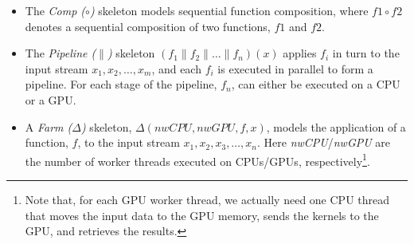 \documentclass[smallextended]{svjour3}
\begin{document}
\begin{itemize}
\item The \emph{Comp ($\circ$)} skeleton models sequential function composition, where
$f1 \circ f2$ denotes a sequential composition of two functions, $f1$ and $f2$.
\item The \emph{Pipeline ($\parallel$)} skeleton 
  $(f_1 \parallel f_2 \parallel \dots \parallel f_n)(x) $ applies $f_i$ in turn
  to the input stream $x_1,x_2,\dots,x_m$, and each $f_i$ is executed in parallel to form a pipeline.
  For each stage of the pipeline, $f_n$, can either be executed on a CPU or a GPU.


\item A \emph{Farm ($\Delta$)} skeleton,  $\Delta(\mathit{nwCPU},\mathit{nwGPU},f,x)$, models the application of a function,
  $f$, to the input stream
  $x_1,x_2,x_3,\dots,x_n$. 
  Here \emph{nwCPU}/\emph{nwGPU} are the number of worker
  threads executed on CPUs/GPUs, respectively\footnote{Note that, for each GPU worker thread, we
    actually need one CPU thread that moves the input data to the GPU
    memory, sends the kernels to the GPU, and retrieves
    the results.}.
\end{itemize}

\noindent
\end{document}
